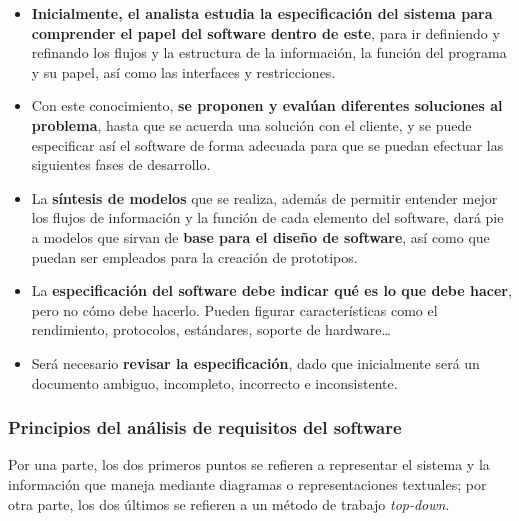 \begin{itemize}
    \item \textbf{Inicialmente, el analista estudia la especificación del sistema para comprender el papel del software dentro de este}, para ir definiendo y refinando los flujos y la estructura de la información, la función del programa y su papel, así como las interfaces y restricciones.
    \item Con este conocimiento, \textbf{se proponen y evalúan diferentes soluciones al problema}, hasta que se acuerda una solución con el cliente, y se puede especificar así el software de forma adecuada para que se puedan efectuar las siguientes fases de desarrollo.
    \item La \textbf{síntesis de modelos} que se realiza, además de permitir entender mejor los flujos de información y la función de cada elemento del software, dará pie a modelos que sirvan de \textbf{base para el diseño de software}, así como que puedan ser empleados para la creación de prototipos.
    \item La \textbf{especificación del software debe indicar qué es lo que debe hacer}, pero no cómo debe hacerlo. Pueden figurar características como el rendimiento, protocolos, estándares, soporte de hardware\ldots
    \item Será necesario \textbf{revisar la especificación}, dado que inicialmente será un documento ambiguo, incompleto, incorrecto e inconsistente.
\end{itemize}

\subsubsection{Principios del análisis de requisitos del software}

Por una parte, los dos primeros puntos se refieren a representar el sistema y la información que maneja mediante diagramas o representaciones textuales; por otra parte, los dos últimos se refieren a un método de trabajo \textit{top-down}.

